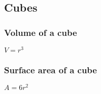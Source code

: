 
\subsection{Cubes}

\subsubsection{Volume of a cube}

\(V=r^3\)

\subsubsection{Surface area of a cube}

\(A=6r^2\)

